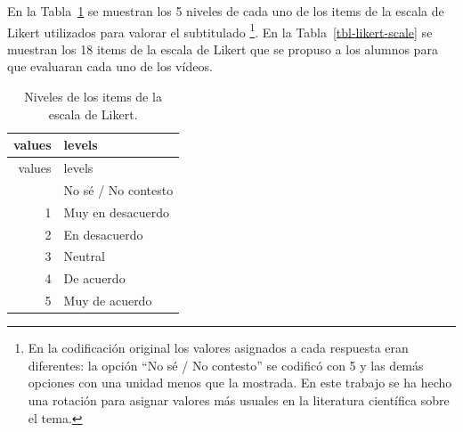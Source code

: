 \documentclass[
  12pt,
  a4paper,
  extrafontsizes,
  onecolumn,
  openright]{memoir}
\begin{document}
En la Tabla~\ref{tbl-likert-levels} se muestran los 5 niveles de cada
uno de los items de la escala de Likert utilizados para valorar el
subtitulado \footnote{En la codificación original los valores asignados
  a cada respuesta eran diferentes: la opción \enquote{No sé / No
  contesto} se codificó con 5 y las demás opciones con una unidad menos
  que la mostrada. En este trabajo se ha hecho una rotación para asignar
  valores más usuales en la literatura científica sobre el tema.}. En la
Tabla~\ref{tbl-likert-scale} se muestran los 18 items de la escala de
Likert que se propuso a los alumnos para que evaluaran cada uno de los
vídeos.

\hypertarget{tbl-likert-levels}{}
\begin{longtable}[]{@{}rl@{}}
\caption{\label{tbl-likert-levels}Niveles de los items de la escala de
Likert.}\tabularnewline
\toprule\noalign{}
values & levels \\
\midrule\noalign{}
\endfirsthead
\toprule\noalign{}
values & levels \\
\midrule\noalign{}
\endhead
\bottomrule\noalign{}
\endlastfoot
0 & No sé / No contesto \\
1 & Muy en desacuerdo \\
2 & En desacuerdo \\
3 & Neutral \\
4 & De acuerdo \\
5 & Muy de acuerdo \\
\end{longtable}
\end{document}
